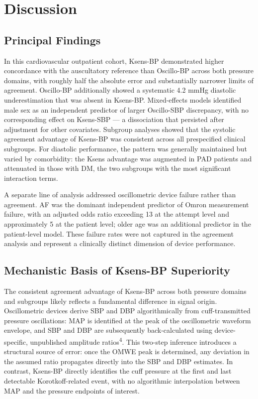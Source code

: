 \documentclass[
  12pt,
  letterpaper,
  openany,
  oneside]{book}
\begin{document}

\chapter{Discussion}\label{discussion}

\section{Principal Findings}\label{principal-findings}

In this cardiovascular outpatient cohort, Ksens-BP demonstrated higher
concordance with the auscultatory reference than Oscillo-BP across both
pressure domains, with roughly half the absolute error and substantially
narrower limits of agreement. Oscillo-BP additionally showed a
systematic 4.2 mmHg diastolic underestimation that was absent in
Ksens-BP. Mixed-effects models identified male sex as an independent
predictor of larger Oscillo-SBP discrepancy, with no corresponding
effect on Ksens-SBP --- a dissociation that persisted after adjustment
for other covariates. Subgroup analyses showed that the systolic
agreement advantage of Ksens-BP was consistent across all prespecified
clinical subgroups. For diastolic performance, the pattern was generally
maintained but varied by comorbidity: the Ksens advantage was augmented
in PAD patients and attenuated in those with DM, the two subgroups with
the most significant interaction terms.

A separate line of analysis addressed oscillometric device failure
rather than agreement. AF was the dominant independent predictor of
Omron measurement failure, with an adjusted odds ratio exceeding 13 at
the attempt level and approximately 5 at the patient level; older age
was an additional predictor in the patient-level model. These failure
rates were not captured in the agreement analysis and represent a
clinically distinct dimension of device performance.

\section{Mechanistic Basis of Ksens-BP
Superiority}\label{mechanistic-basis-of-ksens-bp-superiority}

The consistent agreement advantage of Ksens-BP across both pressure
domains and subgroups likely reflects a fundamental difference in signal
origin. Oscillometric devices derive SBP and DBP algorithmically from
cuff-transmitted pressure oscillations: MAP is identified at the peak of
the oscillometric waveform envelope, and SBP and DBP are subsequently
back-calculated using device-specific, unpublished amplitude
ratios\textsuperscript{4}. This two-step inference introduces a
structural source of error: once the OMWE peak is determined, any
deviation in the assumed ratio propagates directly into the SBP and DBP
estimates. In contrast, Ksens-BP directly identifies the cuff pressure
at the first and last detectable Korotkoff-related event, with no
algorithmic interpolation between MAP and the pressure endpoints of
interest.
\end{document}
